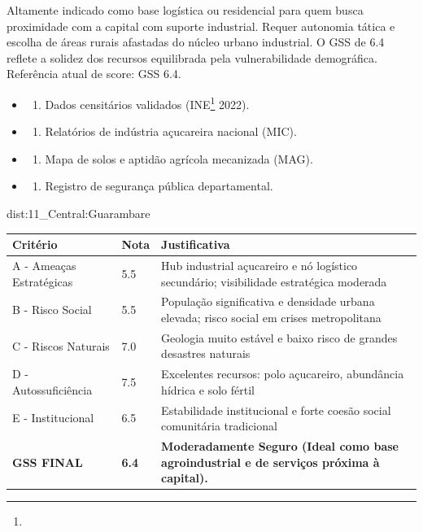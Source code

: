 {Altamente indicado como base logística ou residencial para quem busca
proximidade com a capital com suporte industrial. Requer autonomia
tática e escolha de áreas rurais afastadas do núcleo urbano industrial.
O GSS de 6.4 reflete a solidez dos recursos equilibrada pela
vulnerabilidade demográfica. Referência atual de score: GSS 6.4.

\begin{itemize}
\tightlist
\item
  \begin{enumerate}
  \def\labelenumi{\arabic{enumi})}
  \tightlist
  \item
    Dados censitários validados (INE\footnote{\fineINE} 2022).
  \end{enumerate}
\item
  \begin{enumerate}
  \def\labelenumi{\arabic{enumi})}
  \setcounter{enumi}{1}
  \tightlist
  \item
    Relatórios de indústria açucareira nacional (MIC).
  \end{enumerate}
\item
  \begin{enumerate}
  \def\labelenumi{\arabic{enumi})}
  \setcounter{enumi}{2}
  \tightlist
  \item
    Mapa de solos e aptidão agrícola mecanizada (MAG).
  \end{enumerate}
\item
  \begin{enumerate}
  \def\labelenumi{\arabic{enumi})}
  \setcounter{enumi}{3}
  \tightlist
  \item
    Registro de segurança pública departamental.
  \end{enumerate}
\end{itemize}}{dist:11_Central:Guarambare}
\begin{table}[ht!]
\small \begin{tabular}{p{3.0cm}p{0.8cm}p{6.0cm}} \toprule
\textbf{Critério} & \textbf{Nota} & \textbf{Justificativa} \\ \midrule
A - Ameaças Estratégicas & 5.5 & Hub industrial açucareiro e nó logístico secundário; visibilidade estratégica moderada \\
B - Risco Social & 5.5 & População significativa e densidade urbana elevada; risco social em crises metropolitana \\
C - Riscos Naturais & 7.0 & Geologia muito estável e baixo risco de grandes desastres naturais \\
D - Autossuficiência & 7.5 & Excelentes recursos: polo açucareiro, abundância hídrica e solo fértil \\
E - Institucional & 6.5 & Estabilidade institucional e forte coesão social comunitária tradicional \\
\midrule \textbf{GSS FINAL} & \textbf{6.4} & \textbf{Moderadamente Seguro (Ideal como base agroindustrial e de serviços próxima à capital).} \\ \bottomrule \end{tabular}
\end{table}
